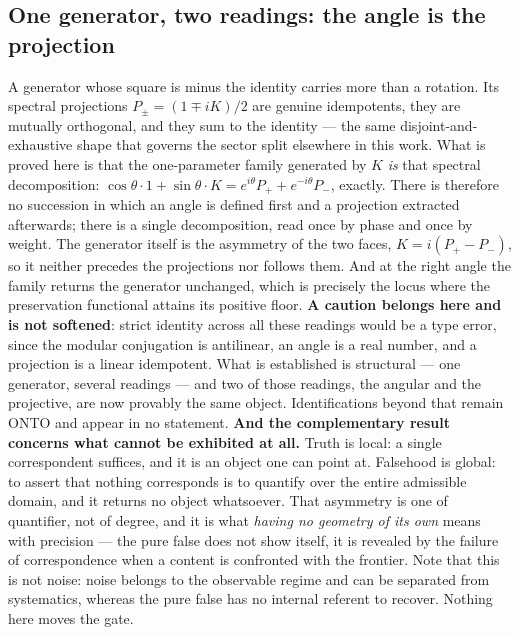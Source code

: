 \documentclass[11pt]{article}
\theoremstyle{definition}\newtheorem{deriv}{Derivation}
\begin{document}
\subsection*{One generator, two readings: the angle is the projection}A generator whose square is minus the identity carries more than a rotation. Its spectral projections $P_\pm = (1 \mp iK)/2$ are genuine idempotents, they are mutually orthogonal, and they sum to the identity --- the same disjoint-and-exhaustive shape that governs the sector split elsewhere in this work. What is proved here is that the one-parameter family generated by $K$ \emph{is} that spectral decomposition: $\cos\theta\cdot 1 + \sin\theta\cdot K = e^{i\theta}P_+ + e^{-i\theta}P_-$, exactly. There is therefore no succession in which an angle is defined first and a projection extracted afterwards; there is a single decomposition, read once by phase and once by weight. The generator itself is the asymmetry of the two faces, $K = i(P_+ - P_-)$, so it neither precedes the projections nor follows them. And at the right angle the family returns the generator unchanged, which is precisely the locus where the preservation functional attains its positive floor. \textbf{A caution belongs here and is not softened}: strict identity across all these readings would be a type error, since the modular conjugation is antilinear, an angle is a real number, and a projection is a linear idempotent. What is established is structural --- one generator, several readings --- and two of those readings, the angular and the projective, are now provably the same object. Identifications beyond that remain \textsf{ONTO} and appear in no statement. \textbf{And the complementary result concerns what cannot be exhibited at all.} Truth is local: a single correspondent suffices, and it is an object one can point at. Falsehood is global: to assert that nothing corresponds is to quantify over the entire admissible domain, and it returns no object whatsoever. That asymmetry is one of quantifier, not of degree, and it is what \emph{having no geometry of its own} means with precision --- the pure false does not show itself, it is revealed by the failure of correspondence when a content is confronted with the frontier. Note that this is not noise: noise belongs to the observable regime and can be separated from systematics, whereas the pure false has no internal referent to recover. Nothing here moves the gate.
\end{document}
